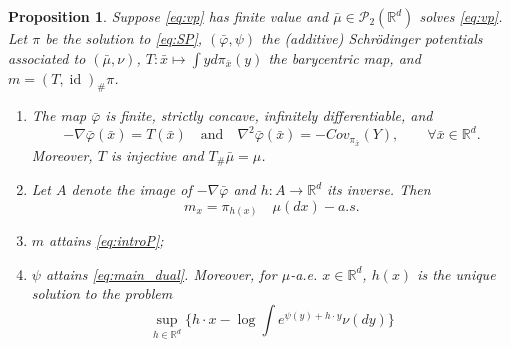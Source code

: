 \documentclass[reqno, a4paper]{amsart}
\DeclareMathOperator{\id}{id}
\theoremstyle{plain}
\newtheorem{proposition}[theorem]{Proposition}
\theoremstyle{definition}
\theoremstyle{remark}
\numberwithin{equation}{section}
\numberwithin{theorem}{section}
\newcommand{\R}{\mathbb{R}}
\newcommand{\Rd}{\mathbb{R}^{d}}
\newcommand{\PP}{\mathcal{P}}
\begin{document}
	
	\begin{proposition}\label{pro:vp_to_D}
		Suppose \eqref{eq:vp} has finite value and $\bar\mu\in\PP_2(\Rd)$ solves \eqref{eq:vp}.  Let $\pi$ be the solution to \eqref{eq:SP}, $(\bar\varphi,\psi)$ the (additive) Schrödinger potentials associated to $(\bar \mu,\nu)$, $T :\bar x \mapsto  \int y d\pi_{\bar x}(y)$ the barycentric map, and $m = (T,\id)_\# \pi$.  
		\begin{enumerate}
			\item The map $\bar\varphi$ is finite, strictly concave, infinitely differentiable, and 
			\begin{equation}\label{eq:diff_SP}
				-\nabla \bar\varphi (\bar x) = T(\bar x) \quad \text{and} \quad \nabla^2 \bar\varphi(\bar x) = -Cov_{\pi_{\bar x}}(Y), \qquad \forall \bar x \in \R^d.
			\end{equation}
			Moreover, $T$ is injective and $T_\# \bar \mu = \mu$.
			\item Let $A$ denote the image of $-\nabla \bar\varphi$ and $h : A \to \R^d$ its inverse. Then $$m_x = \pi_{h(x)} \quad \mu(dx)-a.s.$$  
			\item $m$ attains \eqref{eq:introP};
			\item $\psi$ attains \eqref{eq:main_dual}. Moreover, for $\mu$-a.e. $x \in \R^d$, $h(x)$ is the unique solution to the problem \begin{equation*}\label{eq:inner_dual}
				\sup_{h \in \R^d} \{h \cdot x - \log \int e^{\psi(y)+h\cdot y} \nu(dy)\} \tag{$I_x$}
			\end{equation*}
		\end{enumerate}    
	\end{proposition}
	
	
	
\end{document}
